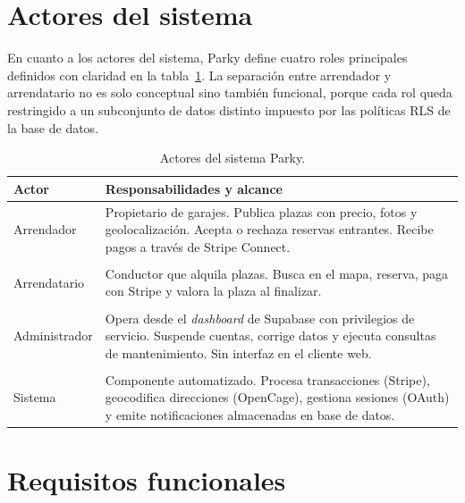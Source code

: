 \section{Actores del sistema}
\label{sec:actores}

En cuanto a los actores del sistema, Parky define cuatro roles principales definidos con claridad en la tabla~\ref{tab:actores-principales}. La separación entre arrendador y arrendatario no es solo conceptual sino también funcional, porque cada rol queda restringido a un subconjunto de datos distinto impuesto por las políticas RLS de la base de datos.

\begin{table}[H]
  \centering
  \caption{Actores del sistema Parky.}
  \label{tab:actores-principales}
  \begin{tabularx}{\textwidth}{lX}
    \toprule
    \textbf{Actor} & \textbf{Responsabilidades y alcance}                                                                                                                                             \\
    \midrule
    \rowcolor{gray!5}
    Arrendador     & Propietario de garajes. Publica plazas con precio, fotos y geolocalización. Acepta o rechaza reservas entrantes. Recibe pagos a través de Stripe Connect.                        \\
    \\
    Arrendatario   & Conductor que alquila plazas. Busca en el mapa, reserva, paga con Stripe y valora la plaza al finalizar.                                                                         \\
    \\
    \rowcolor{gray!5}
    Administrador  & Opera desde el \textit{dashboard} de Supabase con privilegios de servicio. Suspende cuentas, corrige datos y ejecuta consultas de mantenimiento. Sin interfaz en el cliente web. \\
    \\
    Sistema        & Componente automatizado. Procesa transacciones (Stripe), geocodifica direcciones (OpenCage), gestiona sesiones (OAuth) y emite notificaciones almacenadas en base de datos.      \\
    \bottomrule
  \end{tabularx}
\end{table}

\section{Requisitos funcionales}
\label{sec:requisitos_funcionales}

